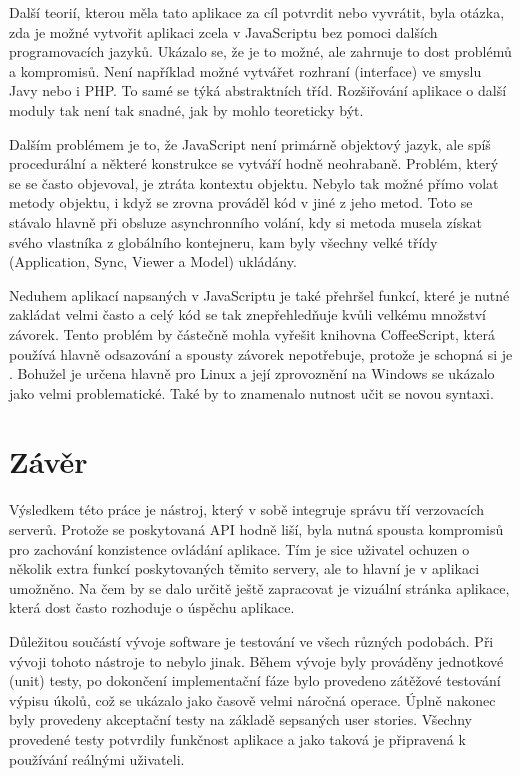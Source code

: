 Další teorií, kterou měla tato aplikace za cíl potvrdit nebo vyvrátit, byla otázka, zda je možné vytvořit aplikaci zcela v JavaScriptu bez pomoci dalších programovacích jazyků. Ukázalo se, že je to možné, ale zahrnuje to dost problémů a kompromisů. Není například možné vytvářet rozhraní (interface) ve smyslu Javy nebo i PHP. To samé se týká abstraktních tříd. Rozšiřování aplikace o další moduly tak není tak snadné, jak by mohlo teoreticky být.

Dalším problémem je to, že JavaScript není primárně objektový jazyk, ale spíš procedurální a některé konstrukce se vytváří hodně neohrabaně. Problém, který se se často objevoval, je ztráta kontextu objektu. Nebylo tak možné přímo volat metody objektu, i když se zrovna prováděl kód v jiné z jeho metod. Toto se stávalo hlavně při obsluze asynchronního volání, kdy si metoda musela získat svého vlastníka z globálního kontejneru, kam byly všechny velké třídy (Application, Sync, Viewer a Model) ukládány.

Neduhem aplikací napsaných v JavaScriptu je také přehršel funkcí, které je nutné zakládat velmi často a celý kód se tak znepřehledňuje kvůli velkému množství závorek. Tento problém by částečně mohla vyřešit knihovna CoffeeScript\cite{coffeescript}, která používá hlavně odsazování a spousty závorek nepotřebuje, protože je schopná si je . Bohužel je určena hlavně pro Linux a její zprovoznění na Windows se ukázalo jako velmi problematické. Také by to znamenalo nutnost učit se novou syntaxi.

\chapter{Závěr}

Výsledkem této práce je nástroj, který v sobě integruje správu tří verzovacích serverů. Protože se poskytovaná API hodně liší, byla nutná spousta kompromisů pro zachování konzistence ovládání aplikace. Tím je sice uživatel ochuzen o několik extra funkcí poskytovaných těmito servery, ale to hlavní je v aplikaci umožněno. Na čem by se dalo určitě ještě zapracovat je vizuální stránka aplikace, která dost často rozhoduje o úspěchu aplikace.

Důležitou součástí vývoje software je testování ve všech různých podobách. Při vývoji tohoto nástroje to nebylo jinak. Během vývoje byly prováděny jednotkové (unit) testy, po dokončení implementační fáze bylo provedeno zátěžové testování výpisu úkolů, což se ukázalo jako časově velmi náročná operace. Úplně nakonec byly provedeny akceptační testy na základě sepsaných user stories. Všechny provedené testy potvrdily funkčnost aplikace a jako taková je připravená k používání reálnými uživateli.